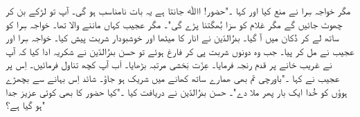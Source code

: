         مگر خواجہ سِرا نے منع کیا اور کہا ۔"حضور! اﷲ جانتا ہے يہ بات نامناسب ہو گی۔ آپ تو لڑکے بن کر چھوٹ جائیں گے مگر غلام کو سزا بُھگتنا پڑے گی"۔ مگر عجیب کہاں ماننے والا تھا۔ خواجہ سِرا کو ساتھ لے کر دُکان میں آ گیا۔ بدرُالدّین نے انار  کا میٹھا اور خوشبودار  شربت پیش کیا۔ خواجہ سِرا اور عجیب نے مل کر پیا۔
جب وہ دونوں شربت پی کر فارغ ہوئے تو حسن بدرُالدّین نے شکریہ ادا کیا کہ آپ نے غریب خانے پر قدم رنجہ فرمایا۔ عِزّت بَخشی مرتبہ بڑھایا۔ اَب آپ کچھ تناول فرمائیں۔ اِس پر عجیب نے کہا ۔"باورچی تم بھی ھمارے ساتھ کھانے میں شریک ہو جاؤ۔ شائد اِس بہانے سے بچھڑے ہوؤں کو  خُدا ایک بار پھر ملا دے"۔
حسن بدرُالدّین نے دریافت کیا ۔"کیا حضور کا بھی کوئی عزیز جدا ہو گیا ہے؟" 


